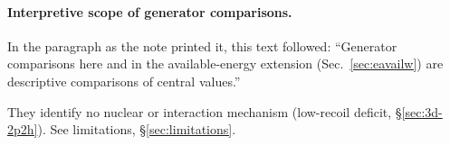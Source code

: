 \paragraph{Interpretive scope of generator comparisons.} In the paragraph as the note printed it, this text followed: ``Generator comparisons here and in the available-energy extension (Sec.~\ref{sec:eavailw}) are descriptive comparisons of central values.''\par They identify no nuclear or interaction mechanism (low-recoil deficit, \S\ref{sec:3d-2p2h}). See limitations, \S\ref{sec:limitations}.

